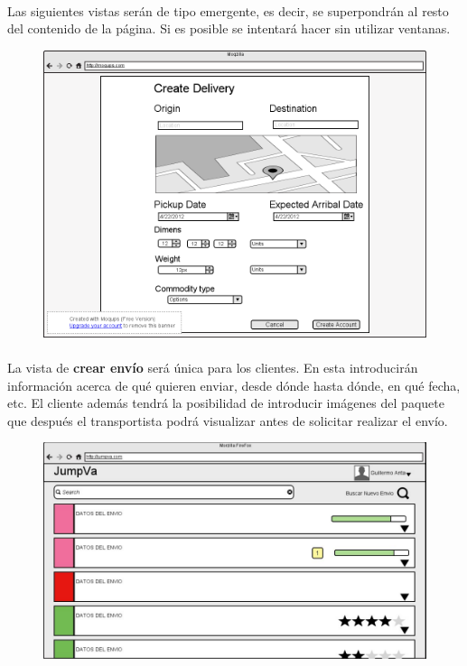 \documentclass[10pt, a4paper,spanish]{article}
\begin{document}
		\paragraph{}
		Las siguientes vistas serán de tipo emergente, es decir, se superpondrán al resto del contenido de la página. Si es posible se intentará hacer sin utilizar ventanas.


		\begin{figure}[H]
			\centering
			\begin{minipage}[b]{0.7\textwidth}
				\includegraphics[width=\textwidth]{res/CrearEnvio.png}
			\end{minipage}
		\end{figure}

		\paragraph{}
		La vista de \textbf{crear envío} será única para los clientes. En esta introducirán información acerca de qué quieren enviar, desde dónde hasta dónde, en qué fecha, etc. El cliente además tendrá la posibilidad de introducir imágenes del paquete que después el transportista podrá visualizar antes de solicitar realizar el envío.

		\begin{figure}[H]
			\centering
			\begin{minipage}[b]{0.7\textwidth}
				\includegraphics[width=\textwidth]{res/PaginaPrincipalTransportista.png}
			\end{minipage}
		\end{figure}
\end{document}
